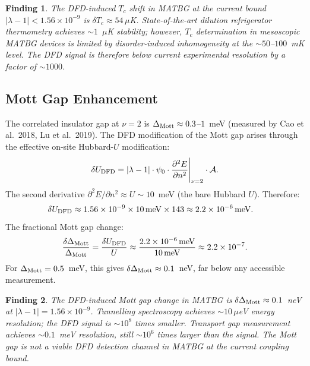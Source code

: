 \documentclass[11pt]{article}
\newtheorem{finding}{Finding}
\newcommand{\ee}[1]{\times 10^{#1}}
\newcommand{\nuFill}{\nu}
\newcommand{\Vmott}{\Delta_{\rm Mott}}
\newcommand{\lambdabound}{1.56\ee{-9}}
\begin{document}
\begin{finding}
  \label{find:Tc_shift}
  The DFD-induced $T_c$ shift in MATBG at the current bound
  $|\lambda-1| < \lambdabound$ is $\delta T_c \approx 54\,\mu$K.
  State-of-the-art dilution refrigerator thermometry achieves
  $\sim 1$~$\mu$K stability; however, $T_c$ determination in mesoscopic
  MATBG devices is limited by disorder-induced inhomogeneity at the
  $\sim 50$--$100$~mK level. The DFD signal is therefore \emph{below
  current experimental resolution} by a factor of $\sim 1000$.
\end{finding}

\subsection{Mott Gap Enhancement}

The correlated insulator gap at $\nuFill = 2$ is $\Vmott \approx 0.3$--$1$~meV
(measured by Cao et al.\ 2018, Lu et al.\ 2019). The DFD modification of the
Mott gap arises through the effective on-site Hubbard-$U$ modification:
\begin{equation}
  \delta U_{\rm DFD} = |\lambda-1| \cdot \psi_0 \cdot
    \frac{\partial^2 E}{\partial n^2}\Bigg|_{\nuFill=2} \cdot \mathcal{A}.
  \label{eq:deltaU}
\end{equation}
The second derivative $\partial^2 E/\partial n^2 \approx U \sim 10$~meV
(the bare Hubbard $U$). Therefore:
\begin{align}
  \delta U_{\rm DFD} &\approx \lambdabound \times 10\,\text{meV} \times 143
    \approx 2.2\ee{-6}\,\text{meV}.
  \label{eq:deltaU_value}
\end{align}
The fractional Mott gap change:
\begin{equation}
  \frac{\delta\Vmott}{\Vmott} = \frac{\delta U_{\rm DFD}}{U}
    \approx \frac{2.2\ee{-6}\,\text{meV}}{10\,\text{meV}}
    \approx 2.2\ee{-7}.
  \label{eq:dMott}
\end{equation}
For $\Vmott = 0.5$~meV, this gives $\delta\Vmott \approx 0.1$~neV,
far below any accessible measurement.

\begin{finding}
  \label{find:mott_gap}
  The DFD-induced Mott gap change in MATBG is
  $\delta\Vmott \approx 0.1$~neV at $|\lambda-1| = \lambdabound$.
  Tunnelling spectroscopy achieves $\sim 10\,\mu$eV energy resolution;
  the DFD signal is $\sim 10^8$ times smaller. Transport gap measurement
  achieves $\sim 0.1$~meV resolution, still $\sim 10^6$ times larger than
  the signal. \emph{The Mott gap is not a viable DFD detection channel
  in MATBG at the current coupling bound.}
\end{finding}
\end{document}
